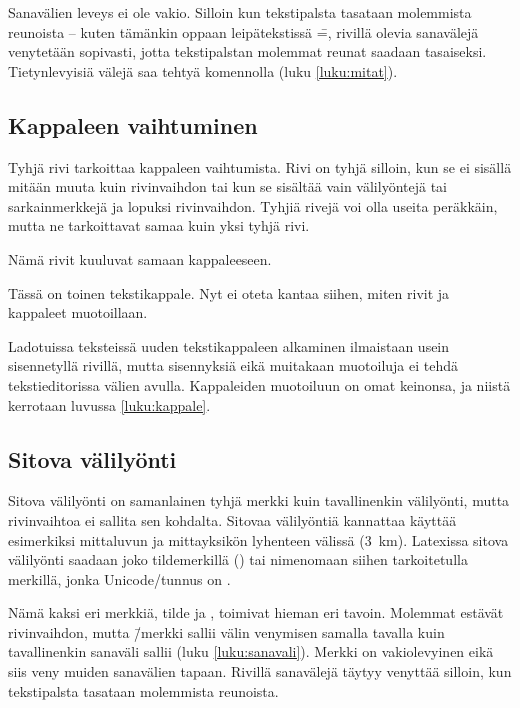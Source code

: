 Sanavälien leveys ei ole vakio. Silloin kun tekstipalsta tasataan
molemmista reunoista -- kuten tämänkin oppaan leipätekstissä \==,
rivillä olevia sanavälejä venytetään sopivasti, jotta tekstipalstan
molemmat reunat saadaan tasaiseksi. Tietynlevyisiä välejä saa tehtyä
komennolla  (luku \ref{luku:mitat}).

\subsection{Kappaleen vaihtuminen}

Tyhjä rivi tarkoittaa kappaleen vaihtumista. Rivi on tyhjä silloin, kun
se ei sisällä mitään muuta kuin rivinvaihdon tai kun se sisältää vain
välilyöntejä tai sarkainmerkkejä ja lopuksi rivinvaihdon. Tyhjiä rivejä
voi olla useita peräkkäin, mutta ne tarkoittavat samaa kuin yksi tyhjä
rivi.

\begin{koodilohkosis}
  Nämä rivit kuuluvat
  samaan kappaleeseen.

  Tässä on toinen tekstikappale.
  Nyt ei oteta kantaa siihen, miten
  rivit ja kappaleet muotoillaan.
\end{koodilohkosis}

Ladotuissa teksteissä uuden tekstikappaleen alkaminen ilmaistaan usein
sisennetyllä rivillä, mutta sisennyksiä eikä muitakaan muotoiluja ei
tehdä tekstieditorissa välien avulla. Kappaleiden muotoiluun on omat
keinonsa, ja niistä kerrotaan luvussa \ref{luku:kappale}.

\subsection{Sitova välilyönti}

Sitova välilyönti on samanlainen tyhjä merkki kuin tavallinenkin
välilyönti, mutta rivinvaihtoa ei sallita sen kohdalta. Sitovaa
välilyöntiä kannattaa käyttää esimerkiksi mittaluvun ja mittayksikön
lyhenteen välissä (3~km). Latexissa sitova välilyönti saadaan joko
tildemerkillä (\koodi{\textasciitilde}) tai nimenomaan siihen
tarkoitetulla merkillä, jonka Unicode\-/tunnus on .

Nämä kaksi eri merkkiä, tilde ja , toimivat hieman eri
tavoin. Molemmat estävät rivinvaihdon, mutta
\koodi{\textasciitilde}\=/merkki sallii välin venymisen samalla tavalla
kuin tavallinenkin sanaväli sallii (luku \ref{luku:sanavali}). Merkki
 on vakiolevyinen eikä siis veny muiden sanavälien
tapaan. Rivillä sanavälejä täytyy venyttää silloin, kun tekstipalsta
tasataan molemmista reunoista.

